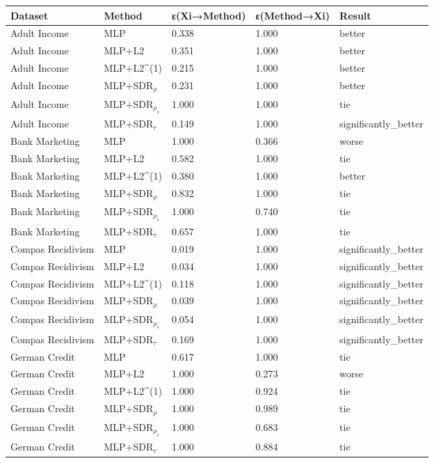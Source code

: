 \begin{tabular}{lllll}
\toprule
Dataset & Method & ε(Xi→Method) & ε(Method→Xi) & Result \\
\midrule
Adult Income & MLP & 0.338 & 1.000 & better \\
Adult Income & MLP+L2 & 0.351 & 1.000 & better \\
Adult Income & MLP+L2^{(1)} & 0.215 & 1.000 & better \\
Adult Income & MLP+SDR$_{\rho}$ & 0.231 & 1.000 & better \\
Adult Income & MLP+SDR$_{\rho_s}$ & 1.000 & 1.000 & tie \\
Adult Income & MLP+SDR$_{\tau}$ & 0.149 & 1.000 & significantly_better \\
Bank Marketing & MLP & 1.000 & 0.366 & worse \\
Bank Marketing & MLP+L2 & 0.582 & 1.000 & tie \\
Bank Marketing & MLP+L2^{(1)} & 0.380 & 1.000 & better \\
Bank Marketing & MLP+SDR$_{\rho}$ & 0.832 & 1.000 & tie \\
Bank Marketing & MLP+SDR$_{\rho_s}$ & 1.000 & 0.740 & tie \\
Bank Marketing & MLP+SDR$_{\tau}$ & 0.657 & 1.000 & tie \\
Compas Recidivism & MLP & 0.019 & 1.000 & significantly_better \\
Compas Recidivism & MLP+L2 & 0.034 & 1.000 & significantly_better \\
Compas Recidivism & MLP+L2^{(1)} & 0.118 & 1.000 & significantly_better \\
Compas Recidivism & MLP+SDR$_{\rho}$ & 0.039 & 1.000 & significantly_better \\
Compas Recidivism & MLP+SDR$_{\rho_s}$ & 0.054 & 1.000 & significantly_better \\
Compas Recidivism & MLP+SDR$_{\tau}$ & 0.169 & 1.000 & significantly_better \\
German Credit & MLP & 0.617 & 1.000 & tie \\
German Credit & MLP+L2 & 1.000 & 0.273 & worse \\
German Credit & MLP+L2^{(1)} & 1.000 & 0.924 & tie \\
German Credit & MLP+SDR$_{\rho}$ & 1.000 & 0.989 & tie \\
German Credit & MLP+SDR$_{\rho_s}$ & 1.000 & 0.683 & tie \\
German Credit & MLP+SDR$_{\tau}$ & 1.000 & 0.884 & tie \\
\bottomrule
\end{tabular}
